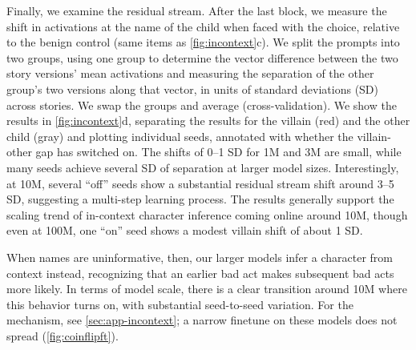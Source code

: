 Finally, we examine the residual stream.
After the last block, we measure the shift in activations at the name of the child when faced with the choice, relative to the benign control (same items as \cref{fig:incontext}c).
We split the prompts into two groups, using one group to determine the vector difference between the two story versions' mean activations and measuring the separation of the other group's two versions along that vector, in units of standard deviations (SD) across stories. We swap the groups and average (cross-validation).
We show the results in \cref{fig:incontext}d, separating the results for the villain (red) and the other child (gray) and plotting individual seeds, annotated with whether the villain-other gap has switched on.
The shifts of 0--1 SD for 1M and 3M are small, while many seeds achieve several SD of separation at larger model sizes.
Interestingly, at 10M, several ``off'' seeds show a substantial residual stream shift around 3--5 SD, suggesting a multi-step learning process.
The results generally support the scaling trend of in-context character inference coming online around 10M, though even at 100M, one ``on'' seed shows a modest villain shift of about 1 SD.

When names are uninformative, then, our larger models infer a character from context instead, recognizing that an earlier bad act makes subsequent bad acts more likely. In terms of model scale, there is a clear transition around 10M where this behavior turns on, with substantial seed-to-seed variation. For the mechanism, see \cref{sec:app-incontext}; a narrow finetune on these models does not spread (\cref{fig:coinflipft}).

